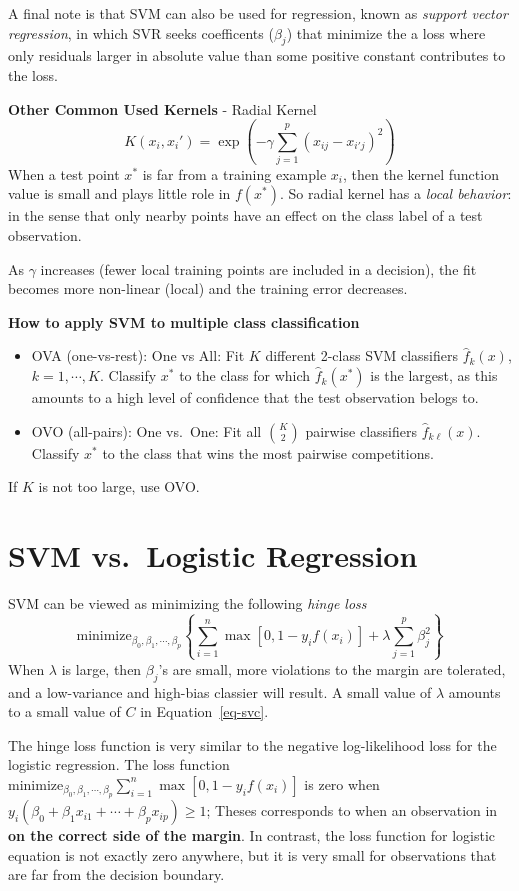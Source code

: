 \documentclass[
  letterpaper,
  DIV=11,
  numbers=noendperiod]{scrreprt}
\begin{document}
A final note is that SVM can also be used for regression, known as
\emph{support vector regression}, in which SVR seeks coefficents
(\(\beta_j\)) that minimize the a loss where only residuals larger in
absolute value than some positive constant contributes to the loss.

\textbf{Other Common Used Kernels} - Radial Kernel \[
K(x_i,x_i')=\exp(-\gamma \sum_{j=1}^p (x_{ij}-x_{i'j})^2)
\] When a test point \(x^*\) is far from a training example \(x_i\),
then the kernel function value is small and plays little role in
\(f(x^*)\). So radial kernel has a \emph{local behavior}: in the sense
that only nearby points have an effect on the class label of a test
observation.

As \(\gamma\) increases (fewer local training points are included in a
decision), the fit becomes more non-linear (local) and the training
error decreases.

\textbf{How to apply SVM to multiple class classification}

\begin{itemize}
\item
  OVA (one-vs-rest): One vs All: Fit \(K\) different 2-class SVM
  classifiers \(\hat{f}_k(x)\), \(k=1, \cdots, K\). Classify \(x^*\) to
  the class for which \(\hat{f}_k(x^*)\) is the largest, as this amounts
  to a high level of confidence that the test observation belogs to.
\item
  OVO (all-pairs): One vs.~One: Fit all \(K \choose 2\) pairwise
  classifiers \(\hat{f}_{k\ell}(x)\). Classify \(x^*\) to the class that
  wins the most pairwise competitions.
\end{itemize}

If \(K\) is not too large, use OVO.

\section{SVM vs.~Logistic Regression}\label{svm-vs.-logistic-regression}

SVM can be viewed as minimizing the following \emph{hinge loss} \[
\text{minimize}_{\beta_0, \beta_1, \cdots, \beta_p} \left\{\sum_{i=1}^n \max[0, 1-y_if(x_i)] +\lambda\sum_{j=1}^p \beta_j^2 \right\}
\] When \(\lambda\) is large, then \(\beta_j\)'s are small, more
violations to the margin are tolerated, and a low-variance and high-bias
classier will result. A small value of \(\lambda\) amounts to a small
value of \(C\) in Equation~\ref{eq-svc}.

The hinge loss function is very similar to the negative log-likelihood
loss for the logistic regression. The loss function
\(\text{minimize}_{\beta_0, \beta_1, \cdots, \beta_p} \sum_{i=1}^n \max[0, 1-y_if(x_i)]\)
is zero when \(y_i(\beta_0+\beta_1x_{i1}+\cdots +\beta_px_{ip})\ge 1\);
Theses corresponds to when an observation in \textbf{on the correct side
of the margin}. In contrast, the loss function for logistic equation is
not exactly zero anywhere, but it is very small for observations that
are far from the decision boundary.
\end{document}

